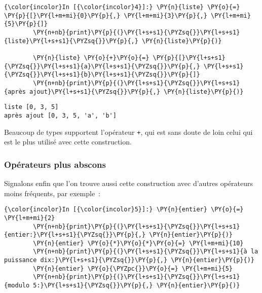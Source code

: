     \begin{Verbatim}[commandchars=\\\{\},frame=single,framerule=0.3mm,rulecolor=\color{cellframecolor}]
{\color{incolor}In [{\color{incolor}4}]:} \PY{n}{liste} \PY{o}{=} \PY{p}{[}\PY{l+m+mi}{0}\PY{p}{,} \PY{l+m+mi}{3}\PY{p}{,} \PY{l+m+mi}{5}\PY{p}{]}
        \PY{n+nb}{print}\PY{p}{(}\PY{l+s+s1}{\PYZsq{}}\PY{l+s+s1}{liste}\PY{l+s+s1}{\PYZsq{}}\PY{p}{,} \PY{n}{liste}\PY{p}{)}
        
        \PY{n}{liste} \PY{o}{+}\PY{o}{=} \PY{p}{[}\PY{l+s+s1}{\PYZsq{}}\PY{l+s+s1}{a}\PY{l+s+s1}{\PYZsq{}}\PY{p}{,} \PY{l+s+s1}{\PYZsq{}}\PY{l+s+s1}{b}\PY{l+s+s1}{\PYZsq{}}\PY{p}{]}
        \PY{n+nb}{print}\PY{p}{(}\PY{l+s+s1}{\PYZsq{}}\PY{l+s+s1}{après ajout}\PY{l+s+s1}{\PYZsq{}}\PY{p}{,} \PY{n}{liste}\PY{p}{)}
\end{Verbatim}


    \begin{Verbatim}[commandchars=\\\{\},frame=single,framerule=0.3mm,rulecolor=\color{cellframecolor}]
liste [0, 3, 5]
après ajout [0, 3, 5, 'a', 'b']
\end{Verbatim}

    Beaucoup de types supportent l'opérateur \texttt{+}, qui est sans doute
de loin celui qui est le plus utilisé avec cette construction.

    \hypertarget{opuxe9rateurs-plus-abscons}{%
\subsubsection{Opérateurs plus
abscons}\label{opuxe9rateurs-plus-abscons}}

    Signalons enfin que l'on trouve aussi cette construction avec d'autres
opérateurs moins fréquents, par exemple~:

    \begin{Verbatim}[commandchars=\\\{\},frame=single,framerule=0.3mm,rulecolor=\color{cellframecolor}]
{\color{incolor}In [{\color{incolor}5}]:} \PY{n}{entier} \PY{o}{=} \PY{l+m+mi}{2}
        \PY{n+nb}{print}\PY{p}{(}\PY{l+s+s1}{\PYZsq{}}\PY{l+s+s1}{entier:}\PY{l+s+s1}{\PYZsq{}}\PY{p}{,} \PY{n}{entier}\PY{p}{)}
        \PY{n}{entier} \PY{o}{*}\PY{o}{*}\PY{o}{=} \PY{l+m+mi}{10}
        \PY{n+nb}{print}\PY{p}{(}\PY{l+s+s1}{\PYZsq{}}\PY{l+s+s1}{à la puissance dix:}\PY{l+s+s1}{\PYZsq{}}\PY{p}{,} \PY{n}{entier}\PY{p}{)}
        \PY{n}{entier} \PY{o}{\PYZpc{}}\PY{o}{=} \PY{l+m+mi}{5}
        \PY{n+nb}{print}\PY{p}{(}\PY{l+s+s1}{\PYZsq{}}\PY{l+s+s1}{modulo 5:}\PY{l+s+s1}{\PYZsq{}}\PY{p}{,} \PY{n}{entier}\PY{p}{)}
\end{Verbatim}


